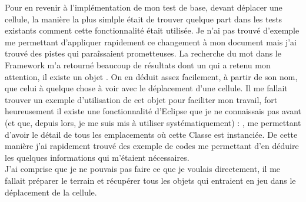 Pour en revenir \`{a} l'impl\'{e}mentation de mon test de base, devant d\'{e}placer une cellule, la mani\`{e}re la plus simlple \'{e}tait de trouver quelque part dans les tests existants comment cette fonctionnalit\'{e} \'{e}tait utilis\'{e}e. Je n'ai pas trouv\'{e} d'exemple me permettant d'appliquer rapidement ce changement \`{a} mon document mais j'ai trouv\'{e} des pistes qui para\^{i}ssaient prometteuses. La recherche du mot  dans le Framework m'a retourn\'{e} beaucoup de r\'{e}sultats dont un qui a retenu mon attention, il existe un objet . On en d\'{e}duit assez facilement, \`{a} partir de son nom, que celui \`{a} quelque chose \`{a} voir avec le d\'{e}placement d'une cellule. Il me fallait trouver un exemple d'utilisation de cet objet pour faciliter mon travail, fort heureusement il existe une fonctionnalit\'{e} d'\gls{Eclipse} que je ne connaissais pas avant (et que, depuis lors, je me suis mis \`{a} utiliser syst\'{e}matiquement) : , me permettant d'avoir le d\'{e}tail de tous les emplacements o\`{u} cette \gls{Classe} est instanci\'{e}e. De cette mani\`{e}re j'ai rapidement trouv\'{e} des exemple de codes me permettant d'en d\'{e}duire les quelques informations qui m'\'{e}taient n\'{e}cessaires.\\

J'ai comprise que je ne pouvais pas faire ce que je voulais directement, il me fallait pr\'{e}parer le terrain et r\'{e}cup\'{e}rer tous les objets qui entraient en jeu dans le d\'{e}placement de la cellule.\\

